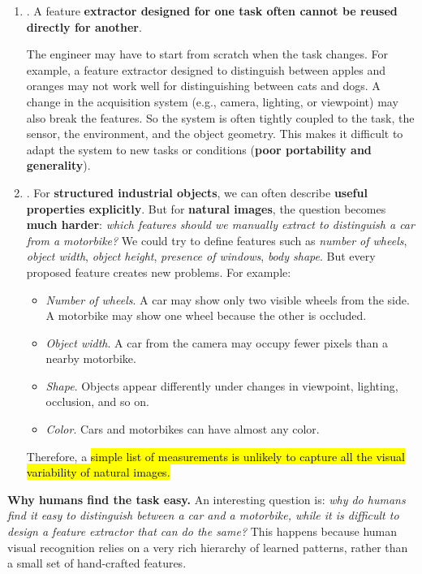 \begin{enumerate}
    \item {}. A feature \textbf{extractor designed for one task often cannot be reused directly for another}.
    
    \highspace
    The engineer may have to start from scratch when the task changes. For example, a feature extractor designed to distinguish between apples and oranges may not work well for distinguishing between cats and dogs. A change in the acquisition system (e.g., camera, lighting, or viewpoint) may also break the features. So the system is often tightly coupled to the task, the sensor, the environment, and the object geometry. This makes it difficult to adapt the system to new tasks or conditions (\textbf{poor portability and generality}).


    \item {}. For \textbf{structured industrial objects}, we can often describe \textbf{useful properties explicitly}. But for \textbf{natural images}, the question becomes \textbf{much harder}: \emph{which features should we manually extract to distinguish a car from a motorbike?} We could try to define features such as \emph{number of wheels}, \emph{object width}, \emph{object height}, \emph{presence of windows}, \emph{body shape}. But every proposed feature creates new problems. For example:
    \begin{itemize}
        \item \emph{Number of wheels}. A car may show only two visible wheels from the side. A motorbike may show one wheel because the other is occluded.
        \item \emph{Object width}. A car from the camera may occupy fewer pixels than a nearby motorbike.
        \item \emph{Shape}. Objects appear differently under changes in viewpoint, lighting, occlusion, and so on.
        \item \emph{Color}. Cars and motorbikes can have almost any color.
    \end{itemize}
    Therefore, a \hl{simple list of measurements is unlikely to capture all the visual variability of natural images.}
\end{enumerate}
\textcolor{Green3}{ \textbf{Why humans find the task easy.}} An interesting question is: \emph{why do humans find it easy to distinguish between a car and a motorbike, while it is difficult to design a feature extractor that can do the same?} This happens because human visual recognition relies on a very rich hierarchy of learned patterns, rather than a small set of hand-crafted features.

